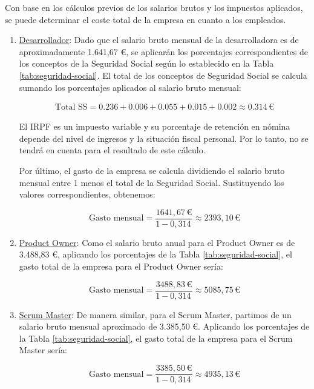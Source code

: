 \begin{enumerate}
    Con base en los cálculos previos de los salarios brutos y los impuestos aplicados, se puede determinar el coste total de la empresa en cuanto a los empleados. 
    
    \begin{enumerate}
        \item \underline{Desarrollador}: Dado que el salario bruto mensual de la desarrolladora es de aproximadamente 1.641,67 €, se aplicarán los porcentajes correspondientes de los conceptos de la Seguridad Social según lo establecido en la Tabla \ref{tab:seguridad-social}. El total de los conceptos de Seguridad Social se calcula sumando los porcentajes aplicados al salario bruto mensual:

        \begin{align*}
        \text{Total SS} = 0.236 + 0.006 + 0.055 + 
         0.015 + 0.002 \approx 0.314 \, \text{{€}}
        \end{align*}
        
        El IRPF es un impuesto variable y su porcentaje de retención en nómina depende del nivel de ingresos y la situación fiscal personal. Por lo tanto, no se tendrá en cuenta para el resultado de este cálculo.
        
        Por último, el gasto de la empresa se calcula dividiendo el salario bruto mensual entre 1 menos el total de la Seguridad Social. Sustituyendo los valores correspondientes, obtenemos:
        
        \[
        \text{{Gasto mensual}} = \frac{{1641,67 \, \text{{€}}}}{{1 - 0,314 \,}} \approx 2393,10 \, \text{{€}}
        \]

        \item \underline{Product Owner}: Como el salario bruto anual para el Product Owner es de 3.488,83 €, aplicando los porcentajes de la Tabla \ref{tab:seguridad-social}, el gasto total de la empresa para el Product Owner sería:

        \[
        \text{{Gasto mensual}} = \frac{{3488,83 \, \text{{€}}}}{{1 - 0,314 \,}} \approx 5085,75 \, \text{{€}}
        \]

        \item \underline{Scrum Master}: De manera similar, para el Scrum Master, partimos de un salario bruto mensual aproximado de 3.385,50 €. Aplicando los porcentajes de la Tabla \ref{tab:seguridad-social}, el gasto total de la empresa para el Scrum Master sería:

        \[
        \text{{Gasto mensual}} = \frac{{3385,50  \, \text{{€}}}}{{1 - 0,314 \,}} \approx 4935,13 \, \text{{€}}
        \]


\end{enumerate}
\end{enumerate}
